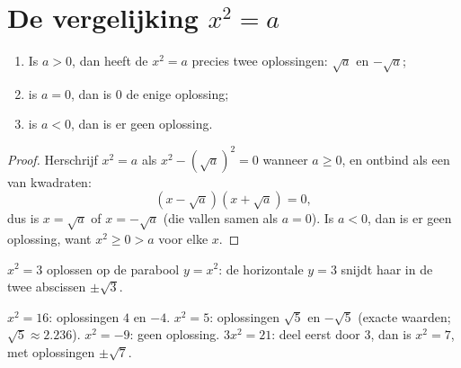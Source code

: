 \section{De vergelijking \texorpdfstring{$x^2 = a$}{x2 = a}}

\begin{theorem}[$x^2 = a$ oplossen]\label{thm:g9:sqrt:equation}
\begin{enumerate}
  \item Is $a > 0$, dan heeft de  $x^2 = a$ precies twee oplossingen:
        $\sqrt a$ en $-\sqrt a$;
  \item is $a = 0$, dan is $0$ de enige oplossing;
  \item is $a < 0$, dan is er geen oplossing.
\end{enumerate}
\end{theorem}

\begin{proof}
Herschrijf $x^2 = a$ als $x^2 - \left(\sqrt a\right)^2 = 0$ wanneer $a \geq 0$, en
ontbind als een  van kwadraten:
\[
\left(x - \sqrt a\right)\left(x + \sqrt a\right) = 0 ,
\]
dus is $x = \sqrt a$ of $x = -\sqrt a$ (die vallen samen als $a = 0$). Is
$a < 0$, dan is er geen oplossing, want $x^2 \geq 0 > a$ voor elke $x$.
\end{proof}

\begin{omfigure}

{\small $x^2 = 3$ oplossen op de parabool $y = x^2$: de horizontale  $y = 3$
snijdt haar in de twee abscissen $\pm\sqrt3$.}
\end{omfigure}

\begin{example}
$x^2 = 16$: oplossingen $4$ en $-4$. \quad
$x^2 = 5$: oplossingen $\sqrt5$ en $-\sqrt5$ (exacte waarden;
$\sqrt5 \approx 2.236$). \quad
$x^2 = -9$: geen oplossing. \quad
$3x^2 = 21$: deel eerst door 3, dan is $x^2 = 7$, met oplossingen $\pm\sqrt7$.
\end{example}


